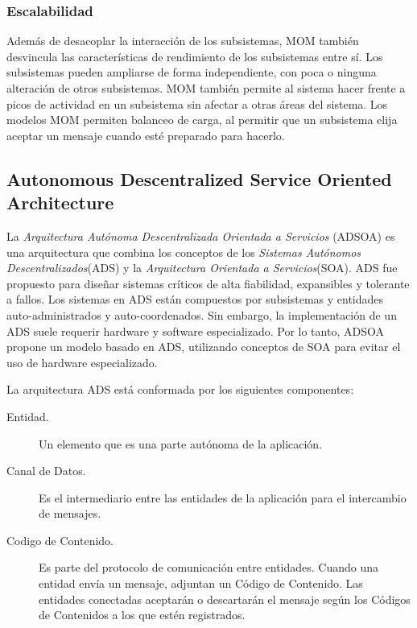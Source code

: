 \documentclass[conference,compsoc]{IEEEtran}
\begin{document}
\subsubsection{Escalabilidad}

Además de desacoplar la interacción de los subsistemas, MOM también desvincula las características de rendimiento de los subsistemas entre sí. Los subsistemas pueden ampliarse de forma independiente, con poca o ninguna alteración de otros subsistemas. MOM también permite al sistema hacer frente a picos de actividad en un subsistema sin afectar a otras áreas del sistema. Los modelos MOM permiten balanceo de carga, al permitir que un subsistema elija aceptar un mensaje cuando esté preparado para hacerlo\cite{curry_2004}.

\subsection{Autonomous Descentralized Service Oriented Architecture}

La \emph{Arquitectura Autónoma Descentralizada Orientada a Servicios} (ADSOA) es una arquitectura que combina los conceptos de los \emph{Sistemas Autónomos Descentralizados}(ADS) y la \emph{Arquitectura Orientada a Servicios}(SOA). ADS fue propuesto para diseñar sistemas críticos de alta fiabilidad, expansibles y tolerante a fallos. Los sistemas en ADS están compuestos por subsistemas y entidades auto-administrados y auto-coordenados. Sin embargo, la implementación de un ADS suele requerir hardware y software especializado. Por lo tanto, ADSOA propone un modelo basado en ADS, utilizando conceptos de SOA para evitar el uso de hardware especializado.\cite{leguizamo_2017}

La arquitectura ADS está conformada por los siguientes componentes\cite{leguizamo_2017}:
\begin{description}
    \item[Entidad.] Un elemento que es una parte autónoma de la aplicación.
    \item[Canal de Datos.] Es el intermediario entre las entidades de la aplicación para el intercambio de mensajes.
    \item[Codigo de Contenido.] Es parte del protocolo de comunicación entre entidades. Cuando una entidad envía un mensaje, adjuntan un Código de Contenido. Las entidades conectadas aceptarán o descartarán el mensaje según los Códigos de Contenidos a los que estén registrados.
\end{description}
\end{document}
